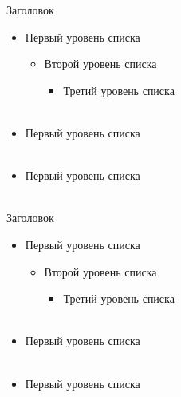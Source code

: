 \documentclass[14pt]{beamer}
\begin{document}
\begin{frame}{Заголовок}
    \begin{itemize}
        \item Первый уровень списка
            \begin{itemize}
                \item Второй уровень списка
                    \begin{itemize}
                        \item Третий уровень списка\\
                            ~
                    \end{itemize}
            \end{itemize}
        \item Первый уровень списка\\
            ~
        \item Первый уровень списка\\
            ~
    \end{itemize}
\end{frame}

\begin{frame}{Заголовок}
    \begin{itemize}
        \item Первый уровень списка
            \begin{itemize}
                \item Второй уровень списка
                    \begin{itemize}
                        \item Третий уровень списка\\
                            ~
                    \end{itemize}
            \end{itemize}
        \item Первый уровень списка\\
            ~
        \item Первый уровень списка\\
            ~
    \end{itemize}
\end{frame}
\end{document}
